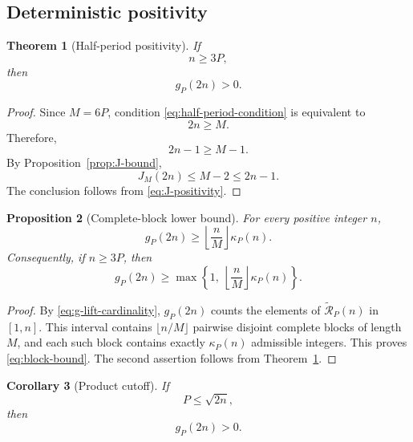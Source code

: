 \documentclass[12pt]{article}
\numberwithin{equation}{section}
\newtheorem{theorem}{Theorem}[section]
\newtheorem{proposition}[theorem]{Proposition}
\newtheorem{corollary}[theorem]{Corollary}
\theoremstyle{definition}
\theoremstyle{remark}
\newcommand{\Rcal}{\mathcal R}
\begin{document}
\subsection{Deterministic positivity}

\begin{theorem}[Half-period positivity]
\label{thm:half-period}
If
\begin{equation}
\label{eq:half-period-condition}
n\geq3P,
\end{equation}
then
\begin{equation}
\label{eq:half-period-positive}
g_P(2n)>0.
\end{equation}
\end{theorem}

\begin{proof}
Since $M=6P$, condition \eqref{eq:half-period-condition} is
equivalent to
\[
2n\geq M.
\]
Therefore,
\[
2n-1\geq M-1.
\]
By Proposition~\ref{prop:J-bound},
\[
J_M(2n)\leq M-2\leq2n-1.
\]
The conclusion follows from \eqref{eq:J-positivity}.
\end{proof}

\begin{proposition}[Complete-block lower bound]
\label{prop:block-bound}
For every positive integer $n$,
\begin{equation}
\label{eq:block-bound}
g_P(2n)
\geq
\left\lfloor\frac{n}{M}\right\rfloor
\kappa_P(n).
\end{equation}
Consequently, if $n\geq3P$, then
\begin{equation}
\label{eq:combined-bound}
g_P(2n)
\geq
\max
\left\{
1,\
\left\lfloor\frac{n}{M}\right\rfloor
\kappa_P(n)
\right\}.
\end{equation}
\end{proposition}

\begin{proof}
By \eqref{eq:g-lift-cardinality}, $g_P(2n)$ counts the elements
of $\widetilde{\Rcal}_P(n)$ in $[1,n]$. This interval contains
$\lfloor n/M\rfloor$ pairwise disjoint complete blocks of
length $M$, and each such block contains exactly
$\kappa_P(n)$ admissible integers. This proves
\eqref{eq:block-bound}. The second assertion follows from
Theorem~\ref{thm:half-period}.
\end{proof}

\begin{corollary}[Product cutoff]
\label{cor:product-cutoff}
If
\begin{equation}
\label{eq:product-cutoff}
P\leq\sqrt{2n},
\end{equation}
then
\[
g_P(2n)>0.
\]
\end{corollary}
\end{document}
